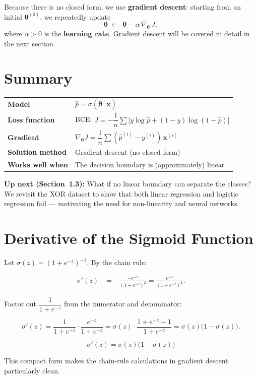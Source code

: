 \documentclass[12pt, a4paper]{article}
\theoremstyle{definition}
\newcommand{\bth}{\boldsymbol{\theta}}
\newcommand{\bx}{\mathbf{x}}
\newcommand{\sigmoid}{\sigma}
\begin{document}
Because there is no closed form, we use \textbf{gradient descent}: starting
from an initial $\bth^{(0)}$, we repeatedly update
\[
  \bth \;\leftarrow\; \bth - \alpha\,\nabla_{\bth}\,J,
\]
where $\alpha > 0$ is the \textbf{learning rate}.
Gradient descent will be covered in detail in the next section.

\section{Summary}

\begin{center}
  \renewcommand{\arraystretch}{1.5}
  \begin{tabular}{ll}
    \toprule
    \textbf{Model}           & $\hat{p} = \sigmoid(\bth^{\top}\bx)$                                        \\
    \textbf{Loss function}   & BCE: $J = -\dfrac{1}{n}\sum\bigl[y\log\hat{p} + (1-y)\log(1-\hat{p})\bigr]$ \\
    \textbf{Gradient}        & $\nabla_{\bth}J = \dfrac{1}{n}\sum(\hat{p}^{(i)} - y^{(i)})\,\bx^{(i)}$     \\
    \textbf{Solution method} & Gradient descent (no closed form)                                           \\
    \textbf{Works well when} & The decision boundary is (approximately) linear                             \\
    \bottomrule
  \end{tabular}
\end{center}

\bigskip
\textbf{Up next (Section~1.3):} What if no linear boundary can separate the
classes?  We revisit the XOR dataset to show that both linear regression and
logistic regression fail — motivating the need for non-linearity and neural
networks.

\appendix
\section{Derivative of the Sigmoid Function}
\label{app:sigmoid-deriv}

Let $\sigmoid(z) = (1 + e^{-z})^{-1}$.  By the chain rule:

\begin{align*}
  \sigmoid'(z)
   & = -\frac{-e^{-z}}{(1+e^{-z})^2}
  = \frac{e^{-z}}{(1+e^{-z})^2}.
\end{align*}

Factor out $\dfrac{1}{1+e^{-z}}$ from the numerator and denominator:

\[
  \sigmoid'(z)
  = \frac{1}{1+e^{-z}} \cdot \frac{e^{-z}}{1+e^{-z}}
  = \sigmoid(z) \cdot \frac{1+e^{-z}-1}{1+e^{-z}}
  = \sigmoid(z)\bigl(1 - \sigmoid(z)\bigr).
\]

\begin{resultbox}
  \[
    \sigmoid'(z) = \sigmoid(z)\bigl(1 - \sigmoid(z)\bigr)
  \]
\end{resultbox}

This compact form makes the chain-rule calculations in gradient descent
particularly clean.
\end{document}
